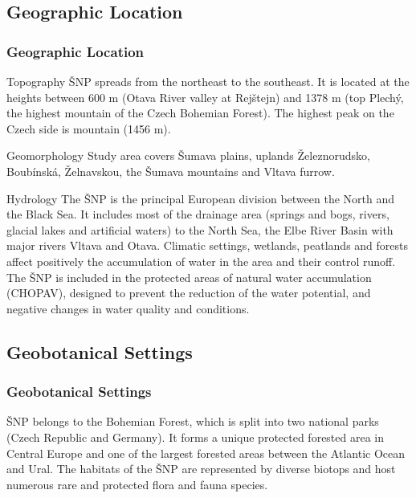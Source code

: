\documentclass[pdflatex,compress,8pt,
	xcolor={dvipsnames,dvipsnames,svgnames,x11names,table},
	hyperref={
	breaklinks = true, 
	pdfauthor={Lemenkova Polina}, 
	pdfsubject={Preentation}, 
	pdfcreator={Lemenkova Polina}, 
	pdfproducer={Lemenkova Polina}, 
	colorlinks=true,linkcolor=blue, 
	citecolor=NavyBlue, 
	urlcolor = NavyBlue, 
	breaklinks = true}]{beamer}
\begin{document}
\subsection{Geographic Location}
\begin{frame}\frametitle{Geographic Location}

\begin{alertblock}{Topography}
ŠNP spreads from the northeast to the southeast. It is located at the heights between 600 m (Otava River valley at Rejštejn) and 1378 m (top Plech\'{y}, the highest mountain of the Czech Bohemian Forest). The highest peak on the Czech side is mountain (1456 m).
\end{alertblock}

\begin{block}{Geomorphology}
Study area covers Šumava plains, uplands Železnorudsko, Boubínská, Želnavskou, the Šumava mountains and Vltava furrow.
\end{block}

\begin{block}{Hydrology}
The ŠNP is the principal European division between the North and the Black Sea. It includes most of the drainage area (springs and bogs, rivers, glacial lakes and artificial waters) to the North Sea, the Elbe River Basin with major rivers Vltava and Otava. Climatic settings, wetlands, peatlands and forests affect positively the accumulation of water in the area and their control runoff. The ŠNP is included in the protected areas of natural water accumulation (CHOPAV), designed to prevent the reduction of the water potential, and negative changes in water quality and conditions.
\end{block}

\end{frame}

\subsection{Geobotanical Settings}
\begin{frame}\frametitle{Geobotanical Settings}
ŠNP belongs to the Bohemian Forest, which is split into two national parks (Czech Republic and Germany). It forms a unique protected forested area in Central Europe and one of the largest forested areas between the Atlantic Ocean and Ural. The habitats of the ŠNP are represented by diverse biotops and host numerous rare and protected flora and fauna species.
\begin{figure}[H]
	\centering
			\hspace{1mm}
			\hspace{1mm}
\end{figure}
\end{frame}
\end{document}

